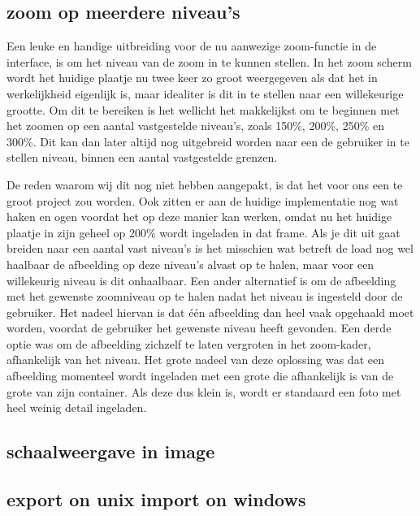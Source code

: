 \subsection{zoom op meerdere niveau's}
Een leuke en handige uitbreiding voor de nu aanwezige zoom-functie in de interface, is om het niveau van de zoom in te kunnen stellen.
In het zoom scherm wordt het huidige plaatje nu twee keer zo groot weergegeven als dat het in werkelijkheid eigenlijk is, maar idealiter is dit in te stellen naar een willekeurige grootte.
Om dit te bereiken is het wellicht het makkelijkst om te beginnen met het zoomen op een aantal vastgestelde niveau's, zoals 150\%, 200\%, 250\% en 300\%.
Dit kan dan later altijd nog uitgebreid worden naar een de gebruiker in te stellen niveau, binnen een aantal vastgestelde grenzen.

De reden waarom wij dit nog niet hebben aangepakt, is dat het voor ons een te groot project zou worden.
Ook zitten er aan de huidige implementatie nog wat haken en ogen voordat het op deze manier kan werken, omdat nu het huidige plaatje in zijn geheel op 200\% wordt ingeladen in dat frame.
Als je dit uit gaat breiden naar een aantal vast niveau's is het misschien wat betreft de load nog wel haalbaar de afbeelding op deze niveau's alvast op te halen, maar voor een willekeurig niveau is dit onhaalbaar.
Een ander alternatief is om de afbeelding met het gewenste zoomniveau op te halen nadat het niveau is ingesteld door de gebruiker.
Het nadeel hiervan is dat \'{e}\'{e}n afbeelding dan heel vaak opgehaald moet worden, voordat de gebruiker het gewenste niveau heeft gevonden.
Een derde optie was om de afbeelding zichzelf te laten vergroten in het zoom-kader, afhankelijk van het niveau. 
Het grote nadeel van deze oplossing was dat een afbeelding momenteel wordt ingeladen met een grote die afhankelijk is van de grote van zijn container.
Als deze dus klein is, wordt er standaard een foto met heel weinig detail ingeladen.

\subsection{schaalweergave in image}

\subsection{export on unix import on windows}
